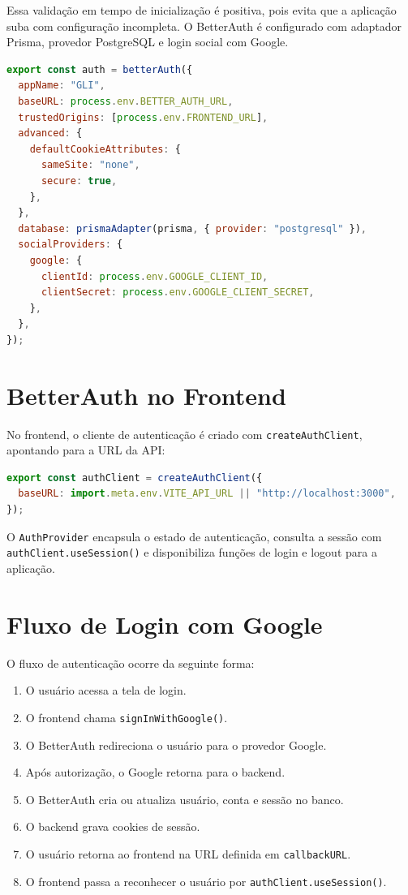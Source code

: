 \documentclass[
    12pt,
    oneside,
    openright,
    a4paper,
    english,
    brazil
]{abntex2}
\begin{document}
Essa validação em tempo de inicialização é positiva, pois evita que a aplicação suba com configuração incompleta. O BetterAuth é configurado com adaptador Prisma, provedor PostgreSQL e login social com Google.

\begin{lstlisting}[language=JavaScript, caption={Configuração resumida do BetterAuth}]
export const auth = betterAuth({
  appName: "GLI",
  baseURL: process.env.BETTER_AUTH_URL,
  trustedOrigins: [process.env.FRONTEND_URL],
  advanced: {
    defaultCookieAttributes: {
      sameSite: "none",
      secure: true,
    },
  },
  database: prismaAdapter(prisma, { provider: "postgresql" }),
  socialProviders: {
    google: {
      clientId: process.env.GOOGLE_CLIENT_ID,
      clientSecret: process.env.GOOGLE_CLIENT_SECRET,
    },
  },
});
\end{lstlisting}

\section{BetterAuth no Frontend}

No frontend, o cliente de autenticação é criado com \texttt{createAuthClient}, apontando para a URL da API:

\begin{lstlisting}[language=JavaScript, caption={Cliente de autenticação no frontend}]
export const authClient = createAuthClient({
  baseURL: import.meta.env.VITE_API_URL || "http://localhost:3000",
});
\end{lstlisting}

O \texttt{AuthProvider} encapsula o estado de autenticação, consulta a sessão com \texttt{authClient.useSession()} e disponibiliza funções de login e logout para a aplicação.

\section{Fluxo de Login com Google}

O fluxo de autenticação ocorre da seguinte forma:

\begin{enumerate}
    \item O usuário acessa a tela de login.
    \item O frontend chama \texttt{signInWithGoogle()}.
    \item O BetterAuth redireciona o usuário para o provedor Google.
    \item Após autorização, o Google retorna para o backend.
    \item O BetterAuth cria ou atualiza usuário, conta e sessão no banco.
    \item O backend grava cookies de sessão.
    \item O usuário retorna ao frontend na URL definida em \texttt{callbackURL}.
    \item O frontend passa a reconhecer o usuário por \texttt{authClient.useSession()}.
\end{enumerate}
\end{document}
